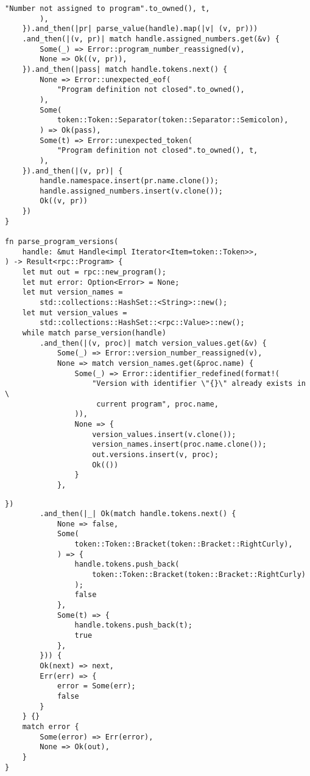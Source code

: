 \begin{lstlisting}[caption={Разбор объединения (часть 2)}, label={lst:rust_parser_union2}]
            "Number not assigned to program".to_owned(), t,
        ),
    }).and_then(|pr| parse_value(handle).map(|v| (v, pr)))
    .and_then(|(v, pr)| match handle.assigned_numbers.get(&v) {
        Some(_) => Error::program_number_reassigned(v),
        None => Ok((v, pr)),
    }).and_then(|pass| match handle.tokens.next() {
        None => Error::unexpected_eof(
            "Program definition not closed".to_owned(),
        ),
        Some(
            token::Token::Separator(token::Separator::Semicolon),
        ) => Ok(pass),
        Some(t) => Error::unexpected_token(
            "Program definition not closed".to_owned(), t,
        ),
    }).and_then(|(v, pr)| {
        handle.namespace.insert(pr.name.clone());
        handle.assigned_numbers.insert(v.clone());
        Ok((v, pr))
    })
}

fn parse_program_versions(
    handle: &mut Handle<impl Iterator<Item=token::Token>>,
) -> Result<rpc::Program> {
    let mut out = rpc::new_program();
    let mut error: Option<Error> = None;
    let mut version_names =
        std::collections::HashSet::<String>::new();
    let mut version_values =
        std::collections::HashSet::<rpc::Value>::new();
    while match parse_version(handle)
        .and_then(|(v, proc)| match version_values.get(&v) {
            Some(_) => Error::version_number_reassigned(v),
            None => match version_names.get(&proc.name) {
                Some(_) => Error::identifier_redefined(format!(
                    "Version with identifier \"{}\" already exists in \
                     current program", proc.name,
                )),
                None => {
                    version_values.insert(v.clone());
                    version_names.insert(proc.name.clone());
                    out.versions.insert(v, proc);
                    Ok(())
                }
            },
\end{lstlisting}
\clearpage
\begin{lstlisting}[caption={Разбор объединения (часть 3)}, label={lst:rust_parser_union3}]
        })
        .and_then(|_| Ok(match handle.tokens.next() {
            None => false,
            Some(
                token::Token::Bracket(token::Bracket::RightCurly),
            ) => {
                handle.tokens.push_back(
                    token::Token::Bracket(token::Bracket::RightCurly)
                );
                false
            },
            Some(t) => {
                handle.tokens.push_back(t);
                true
            },
        })) {
        Ok(next) => next,
        Err(err) => {
            error = Some(err);
            false
        }
    } {}
    match error {
        Some(error) => Err(error),
        None => Ok(out),
    }
}
\end{lstlisting}

